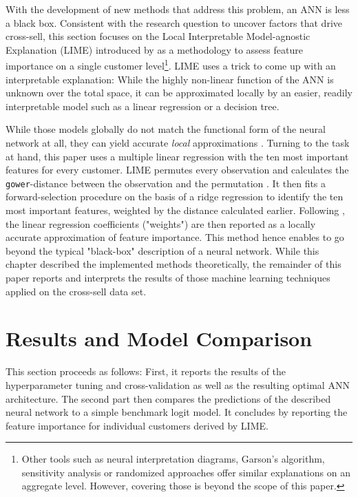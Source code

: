 \documentclass[12pt,a4paper]{article}
\let\code=\texttt
\begin{document}
With the development of new methods that address this problem, an ANN is less a black box.
Consistent with the research question to uncover factors that drive cross-sell, 
this section focuses on the Local Interpretable Model-agnostic Explanation (LIME) introduced by \cite{ribeiroWhyShouldTrust2016a} as a methodology
to assess feature importance on a single customer level\footnote{Other tools such as neural interpretation diagrams, Garson's algorithm, sensitivity analysis or randomized approaches
\citep{oldenIlluminatingBlackBox2002} offer similar explanations on an aggregate level. However, covering those is beyond the scope of this paper.}.
LIME uses a trick to come up with an interpretable explanation: While the highly non-linear function of the ANN is unknown over the total space,
it can be approximated locally by an easier, readily interpretable model such as a linear regression or a decision tree.

While those models globally do not match the functional form of the neural network at all, they can yield accurate \textit{local} approximations
\citep[see figure 3 for a visual example]{ribeiroWhyShouldTrust2016a}.
Turning to the task at hand, this paper uses a multiple linear regression with the ten most important features for every customer.
LIME permutes every observation and calculates the \code{gower}-distance between the observation and the permutation \citep{pedersenUnderstandingLime2018}.
It then fits a forward-selection procedure on the basis of a ridge regression \citep{pedersenPackageLimeLocal2018} to identify the ten most 
important features, weighted by the distance calculated earlier.
Following \cite{ribeiroWhyShouldTrust2016a}, the linear regression coefficients ("weights") are then reported as a locally accurate approximation of feature importance.
This method hence enables to go beyond the typical "black-box" description of a neural network.
While this chapter described the implemented methods theoretically, the remainder of this paper reports and interprets the results of those 
machine learning techniques applied on the cross-sell data set.

\section{Results and Model Comparison}
This section proceeds as follows: First, it reports the results of the hyperparameter tuning and cross-validation as well as the resulting optimal ANN architecture.
The second part then compares the predictions of the described neural network to a simple benchmark logit model.
It concludes by reporting the feature importance for individual customers derived by LIME.
\end{document}
